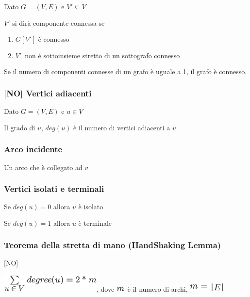 \documentclass{article}
\providecommand{\tightlist}{%
  \setlength{\itemsep}{0pt}\setlength{\parskip}{0pt}}
\begin{document}
{{Dato $G=(V,E)$ e $V' \subseteq V$}

{$V'$ si dirà componente connessa se }

\begin{enumerate}
\tightlist
\item
  {$G[V']$ è connesso}
\item
  $V'${~non è sottoinsieme stretto di un sottografo connesso}
\end{enumerate}

{}

{Se il numero di componenti connesse di un grafo è uguale a 1, }{il
grafo è connesso.}

\hypertarget{h.5nknzat57p06}{\subsubsection{\texorpdfstring{{{[}NO{]}
Vertici adiacenti}}{{[}NO{]} Vertici adiacenti}}\label{h.5nknzat57p06}}

{Dato $G=(V,E)$ e $u \in V$}

{Il grado di $u$, $deg(u)$ è il numero di vertici adiacenti a $u$}

\hypertarget{h.52hqmabofvh0}{\subsubsection{\texorpdfstring{{Arco
incidente}}{Arco incidente}}\label{h.52hqmabofvh0}}

{Un arco che è collegato ad $v$}

\hypertarget{h.vm6z084zc6rf}{\subsubsection{\texorpdfstring{{Vertici isolati e terminali}}{Vertici isolati e terminali}}\label{h.vm6z084zc6rf}}

{Se $deg(u) = 0$ allora $u$ è isolato}

{Se $deg(u) = 1$ allora $u$ è terminale}

\hypertarget{h.d1yeo9bkhutt}{\subsubsection{\texorpdfstring{{Teorema
della stretta di mano (HandShaking
Lemma)}}{Teorema della stretta di mano (HandShaking Lemma)}}\label{h.d1yeo9bkhutt}}

{{[}NO{]}}

\includegraphics{images/image361.png}{, dove
}\includegraphics{images/image235.png}{~è il numero di archi,
}\includegraphics{images/image362.png}

}
\end{document}
